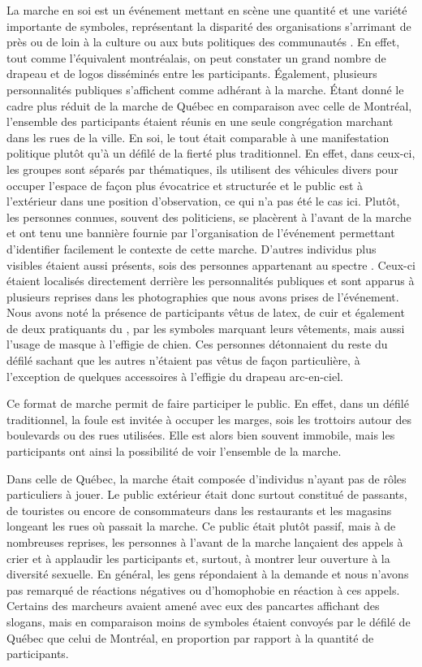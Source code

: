 La marche en soi est un événement mettant en scène une quantité et une variété importante de symboles, représentant la disparité des organisations s'arrimant de près ou de loin à la culture ou aux buts politiques des communautés \lgbt.
En effet, tout comme l'équivalent montréalais, on peut constater un grand nombre de drapeau et de logos disséminés entre les participants.
Également, plusieurs personnalités publiques s'affichent comme adhérant à la marche.
Étant donné le cadre plus réduit de la marche de Québec en comparaison avec celle de Montréal, l'ensemble des participants étaient réunis en une seule congrégation marchant dans les rues de la ville.
En soi, le tout était comparable à une manifestation politique plutôt qu'à un défilé de la fierté plus traditionnel.
En effet, dans ceux-ci, les groupes sont séparés par thématiques, ils utilisent des véhicules divers pour occuper l'espace de façon plus évocatrice et structurée et le public est à l'extérieur dans une position d'observation, ce qui n'a pas été le cas ici.
Plutôt, les personnes connues, souvent des politiciens, se placèrent à l'avant de la marche et ont tenu une bannière fournie par l'organisation de l'événement permettant d'identifier facilement le contexte de cette marche.
D'autres individus plus visibles étaient aussi présents, sois des personnes appartenant au spectre \bdsm{}.
Ceux-ci étaient localisés directement derrière les personnalités publiques et sont apparus à plusieurs reprises dans les photographies que nous avons prises de l'événement.
Nous avons noté la présence de participants vêtus de latex, de cuir et également de deux pratiquants du , par les symboles marquant leurs vêtements, mais aussi l'usage de masque à l'effigie de chien.
Ces personnes détonnaient du reste du défilé sachant que les autres n'étaient pas vêtus de façon particulière, à l'exception de quelques accessoires à l'effigie du drapeau arc-en-ciel.

Ce format de marche permit de faire participer le public.
En effet, dans un défilé traditionnel, la foule est invitée à occuper les marges, sois les trottoirs autour des boulevards ou des rues utilisées.
Elle est alors bien souvent immobile, mais les participants ont ainsi la possibilité de voir l'ensemble de la marche.

Dans celle de Québec, la marche était composée d'individus n'ayant pas de rôles particuliers à jouer.
Le public extérieur était donc surtout constitué de passants, de touristes ou encore de consommateurs dans les restaurants et les magasins longeant les rues où passait la marche.
Ce public était plutôt passif, mais à de nombreuses reprises, les personnes à l'avant de la marche lançaient des appels à crier et à applaudir les participants et, surtout, à montrer leur ouverture à la diversité sexuelle.
En général, les gens répondaient à la demande et nous n'avons pas remarqué de réactions négatives ou d'homophobie en réaction à ces appels.
Certains des marcheurs avaient amené avec eux des pancartes affichant des slogans, mais en comparaison moins de symboles étaient convoyés par le défilé de Québec que celui de Montréal, en proportion par rapport à la quantité de participants.


